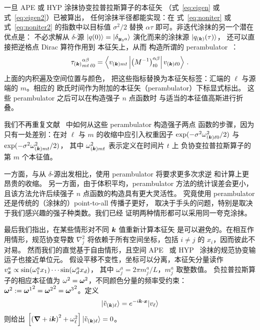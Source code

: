 一旦 APE 或 HYP
涂抹协变拉普拉斯算子的本征矢
（式~\eqref{eq:eigen} 或
式~\eqref{eq:eigen2}）已被算出，
任何涂抹半径都能实现：在
式~\eqref{eq:noniter} 或式~\eqref{eq:noniter2} 的指数中以目标值 $\sigma^2/2$
替换 $\alpha\tau$ 即可。非迭代涂抹的另一个潜在优点是：
不必求解从
$\delta$-源 $|q(0)\rangle=|\delta_{\boldsymbol{y}_0a}\rangle$ 演化而来的涂抹源
$|q_{(\boldsymbol{k})}(\tau)\rangle$，
还可以直接把逆格点 Dirac 算符作用到
本征矢上，从而
构造所谓的 perambulator~\cite{Peardon:2009gh}：
\begin{equation}
{\tau_{(\ensuremath{\boldsymbol{k}})}}^{\alpha\beta}_{m t\, \ell 0}=\left\langle v_{(\boldsymbol{k})m t}\left|\left(M^{-1}\right)^{\alpha\beta}_{t0}\right|v_{(\boldsymbol{k})\ell 0}\right\rangle\,.
\end{equation}
上面的内积遍及空间位置与颜色，
把这些指标替换为本征矢标签：汇端的 $\ell$ 与源端的 $m$。相应的
欧氏时间作为附加的本征矢（perambulator）下标显式标出。
这些 perambulator 之后可以在构造强子 $n$ 点函数时
与适当的本征值高斯进行折叠。

我们不再重复文献~\cite{Peardon:2009gh} 中如何从这些 perambulator 构造强子两点
函数的步骤，因为只有一处差别：在对 $\ell$ 与 $m$ 的收缩中应引入权重因子
$\exp(-\sigma^2\omega_{(\boldsymbol{k})\ell 0}^2/2)$
与 $\exp(-\sigma^2\omega_{(\boldsymbol{k})m t}^2/2)$，
其中 $\omega_{(\boldsymbol{k})m t}^2$ 表示定义在时间片 $t$ 上
负协变拉普拉斯算子的第 $m$ 个本征值。

一方面，与从 $\delta$-源出发相比，使用 perambulator 将要求更多次求逆
和计算上更昂贵的收缩。
另一方面，由于体积平均，perambulator 方法的统计误差会更小，且该方法允许后续强子
$n$ 点函数的构造具有更大灵活性。
究竟使用 perambulator
还是传统的（涂抹的）point-to-all 传播子更好，
取决于手头的问题，特别是取决于我们感兴趣的强子种类数。我们已经
证明两种情形都可以采用同一夸克涂抹。

最后我们指出，在某些情形对不同 $\boldsymbol{k}$ 值重新计算本征矢
是可以避免的。在相互作用情形，规范协变导数
$\nabla^2_j$ 将依赖于所有空间坐标，包括
$i\neq j$ 的 $x_i$，因而彼此不对易。
然而我们的直觉基于自由情形，且空间 APE~\cite{Falcioni:1984ei}
或 HYP~\cite{Hasenfratz:2001hp} 涂抹的规范协变输运子也接近单位元。
假设平移不变性，坐标可以分离，本征矢分量读作
$v^a_{\boldsymbol{x}}\propto\sin(\omega_1^ax_1)\cdots\sin(\omega_d^ax_d)$，
其中 $\omega_j^a=2\pi m_j^a/L$，$m_j^a$ 取整数值。
负拉普拉斯算子的相应本征值为 $\omega^2=\boldsymbol{\omega}^2$，不同颜色分量的频率受约束：
$\boldsymbol{\omega}^2:={\boldsymbol{\omega}^1}^2={\boldsymbol{\omega}^2}^2={\boldsymbol{\omega}^3}^2$。定义
\begin{equation}
|\tilde{v}_{(\boldsymbol{k})\ell}\rangle=e^{-i\boldsymbol{k}\cdot\boldsymbol{x}}|v_{\ell}\rangle
\label{eq:phases}
\end{equation}
则给出
$\left[\left(\boldsymbol{\nabla}+i\boldsymbol{k}\right)^2+\omega_{\ell}^2\right]|\tilde{v}_{(\boldsymbol{k})\ell}\rangle=0$。

